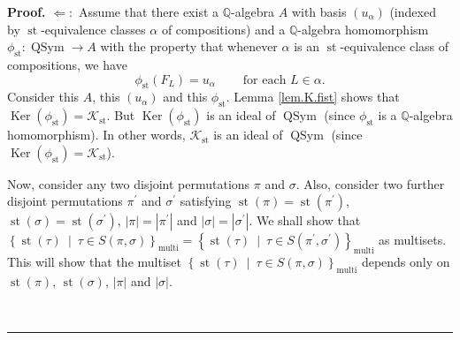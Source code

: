 \documentclass[numbers=enddot,12pt,final,onecolumn,notitlepage]{scrartcl}%
\theoremstyle{definition}
\newenvironment{proof}[1][Proof]{\noindent\textbf{#1.} }{\ \rule{0.5em}{0.5em}}
\begin{document}
\begin{proof}
$\Longleftarrow:$ Assume that there exist a $\mathbb{Q}$-algebra $A$ with
basis $\left(  u_{\alpha}\right)  $ (indexed by $\operatorname*{st}%
$-equivalence classes $\alpha$ of compositions) and a $\mathbb{Q}$-algebra
homomorphism $\phi_{\operatorname*{st}}:\operatorname*{QSym}\rightarrow A$
with the property that whenever $\alpha$ is an $\operatorname*{st}%
$-equivalence class of compositions, we have%
\[
\phi_{\operatorname*{st}}\left(  F_{L}\right)  =u_{\alpha}%
\ \ \ \ \ \ \ \ \ \ \text{for each }L\in\alpha.
\]
Consider this $A$, this $\left(  u_{\alpha}\right)  $ and this $\phi
_{\operatorname*{st}}$. Lemma \ref{lem.K.fist} shows that $\operatorname*{Ker}%
\left(  \phi_{\operatorname*{st}}\right)  =\mathcal{K}_{\operatorname*{st}}$.
But $\operatorname*{Ker}\left(  \phi_{\operatorname*{st}}\right)  $ is an
ideal of $\operatorname*{QSym}$ (since $\phi_{\operatorname*{st}}$ is a
$\mathbb{Q}$-algebra homomorphism). In other words, $\mathcal{K}%
_{\operatorname*{st}}$ is an ideal of $\operatorname*{QSym}$ (since
$\operatorname*{Ker}\left(  \phi_{\operatorname*{st}}\right)  =\mathcal{K}%
_{\operatorname*{st}}$).

Now, consider any two disjoint permutations $\pi$ and $\sigma$. Also, consider
two further disjoint permutations $\pi^{\prime}$ and $\sigma^{\prime}$
satisfying $\operatorname*{st}\left(  \pi\right)  =\operatorname*{st}\left(
\pi^{\prime}\right)  $, $\operatorname*{st}\left(  \sigma\right)
=\operatorname*{st}\left(  \sigma^{\prime}\right)  $, $\left\vert
\pi\right\vert =\left\vert \pi^{\prime}\right\vert $ and $\left\vert
\sigma\right\vert =\left\vert \sigma^{\prime}\right\vert $. We shall show that
$\left\{  \operatorname*{st}\left(  \tau\right)  \ \mid\ \tau\in S\left(
\pi,\sigma\right)  \right\}  _{\operatorname*{multi}} =\left\{
\operatorname*{st}\left(  \tau\right)  \ \mid\ \tau\in S\left(  \pi^{\prime
},\sigma^{\prime}\right)  \right\}  _{\operatorname*{multi}} $ as multisets.
This will show that the multiset \newline$\left\{  \operatorname*{st}\left(
\tau\right)  \ \mid\ \tau\in S\left(  \pi,\sigma\right)  \right\}
_{\operatorname*{multi}} $ depends only on $\operatorname*{st}\left(
\pi\right)  $, $\operatorname*{st}\left(  \sigma\right)  $, $\left\vert
\pi\right\vert $ and $\left\vert \sigma\right\vert $.


\end{proof}
\end{document}

